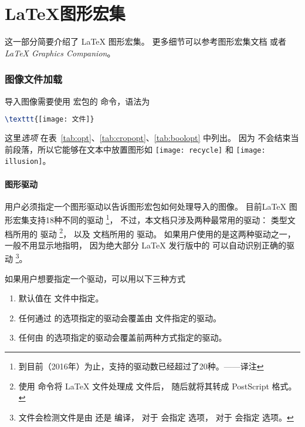 \part{\LaTeX{}图形宏集}\label{part:graphicbundle}

这一部分简要介绍了 \LaTeX{} 图形宏集。
更多细节可以参考图形宏集文档 \cite{grfguide} 或者 \emph{\LaTeX{} Graphics Companion}\cite{Goossens1997}。

\section{图像文件加载}\label{sec:graphicsinclusion}

导入图像需要使用  宏包的 命令，语法为
\begin{lstlisting}[language=LaTeX,frame=shadowbox]
\texttt{[image: 文件]}
\end{lstlisting}
这里\emph{选项} 在表~\ref{tab:opt}、\ref{tab:cropopt}、\ref{tab:boolopt} 中列出。
因为  不会结束当前段落，所以它能够在文本中放置图形如
 \texttt{[image: recycle]} 和 \texttt{[image: illusion]}。

\subsection{图形驱动}\label{ssec:driver}
用户必须指定一个图形驱动以告诉图形宏包如何处理导入的图像。
目前\LaTeX{} 图形宏集支持18种不同的驱动
\footnote{
	到目前（2016年）为止，支持的驱动数已经超过了20种。——译注
	}，
不过，本文档只涉及两种最常用的驱动：
 类型文档所用的  驱动
\footnote{使用  命令将 \LaTeX{} 文件处理成  文件后，
	 随后就将其转成 PostScript 格式。}，
以及 \pdfLaTeX{} 文档所用的  驱动。
如果用户使用的是这两种驱动之一，一般不用显示地指明，
因为绝大部分 \LaTeX{} 发行版中的  可以自动识别正确的驱动
\footnote{ 文件会检测文件是由  还是  编译，
	对于  会指定  选项，
	对于  会指定  选项。}。

如果用户想要指定一个驱动，可以用以下三种方式
\begin{enumerate}
	\item 默认值在  文件中指定。
	\item 任何通过  的选项指定的驱动会覆盖由  文件指定的驱动。
	\item 任何由  的选项指定的驱动会覆盖前两种方式指定的驱动。
\end{enumerate}

